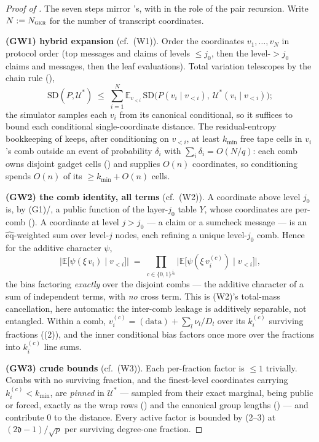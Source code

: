 \documentclass{article}
\newcommand{\extdeg}{\mathfrak{d}}
\newcommand{\eqf}{\widehat{\mathrm{eq}}}
\theoremstyle{definition}
\begin{document}
\begin{proof}[Proof of ]
The seven steps mirror 's, with  in the role of the pair recursion. Write $N := N_{\textsc{gkr}}$ for the number of transcript coordinates.

\textbf{(GW1) hybrid expansion} (cf.\ (W1)). Order the coordinates $v_1, \dots, v_{N}$ in protocol order (top messages and claims of levels $\leq j_0$, then the level-$>j_0$ claims and messages, then the leaf evaluations). Total variation telescopes by the chain rule (),
\[
\mathrm{SD}(P, \mathcal{U}^*) \;\leq\; \sum_{i=1}^{N} \mathbb{E}_{v_{<i}}\,\mathrm{SD}\big(P(v_i \mid v_{<i}),\ \mathcal{U}^*(v_i \mid v_{<i})\big);
\]
the simulator samples each $v_i$ from its canonical conditional, so it suffices to bound each conditional single-coordinate distance. The residual-entropy bookkeeping of  keeps, after conditioning on $v_{<i}$, at least $k_{\min}$ free tape cells in $v_i$'s comb outside an event of probability $\delta_i$ with $\sum_i \delta_i = O(N/q)$: each comb owns disjoint gadget cells () and supplies $O(n)$ coordinates, so conditioning spends $O(n)$ of its $\geq k_{\min} + O(n)$ cells.

\textbf{(GW2) the comb identity, all terms} (cf.\ (W2)). A coordinate above level $j_0$ is, by (G1)/, a public function of the layer-$j_0$ table $Y$, whose coordinates are per-comb (). A coordinate at level $j > j_0$ --- a claim or a sumcheck message --- is an $\eqf$-weighted sum over level-$j$ nodes, each refining a unique level-$j_0$ comb. Hence for the additive character $\psi$,
\[
\big|\mathbb{E}\big[\psi(\xi\, v_i) \mid v_{<i}\big]\big| \;=\; \prod_{c \in \{0,1\}^{j_0}} \big|\mathbb{E}\big[\psi(\xi\, v_i^{(c)}) \mid v_{<i}\big]\big| ,
\]
the bias factoring \emph{exactly} over the disjoint combs --- the additive character of a sum of independent terms, with \emph{no} cross term. This is (W2)'s total-mass cancellation, here automatic: the inter-comb leakage is additively separable, not entangled. Within a comb, $v_i^{(c)} = (\text{data}) + \sum_l \nu_l / D_l$ over its $k_i^{(c)}$ surviving fractions ((2)), and the inner conditional bias factors once more over the fractions into $k_i^{(c)}$ line sums.

\textbf{(GW3) crude bounds} (cf.\ (W3)). Each per-fraction factor is $\leq 1$ trivially. Combs with no surviving fraction, and the finest-level coordinates carrying $k_i^{(c)} < k_{\min}$, are \emph{pinned} in $\mathcal{U}^*$ --- sampled from their exact marginal, being public or forced, exactly as the wrap rows () and the canonical group lengths () --- and contribute $0$ to the distance. Every active factor is bounded by (2--3) at $(2\extdeg-1)/\sqrt p$ per surviving degree-one fraction.


\end{proof}
\end{document}
